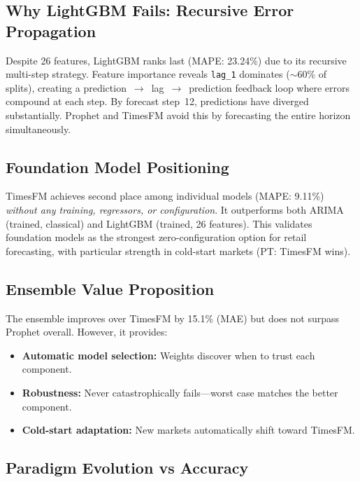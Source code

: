 \documentclass[10pt,twocolumn,a4paper]{article}
\begin{document}
\subsection{Why LightGBM Fails: Recursive Error Propagation}

Despite 26 features, LightGBM ranks last (MAPE: 23.24\%) due to its recursive multi-step strategy. Feature importance reveals \texttt{lag\_1} dominates ($\sim$60\% of splits), creating a prediction~$\rightarrow$~lag~$\rightarrow$~prediction feedback loop where errors compound at each step. By forecast step~12, predictions have diverged substantially. Prophet and TimesFM avoid this by forecasting the entire horizon simultaneously.

\subsection{Foundation Model Positioning}

TimesFM achieves second place among individual models (MAPE: 9.11\%) \textit{without any training, regressors, or configuration}. It outperforms both ARIMA (trained, classical) and LightGBM (trained, 26 features). This validates foundation models as the strongest zero-configuration option for retail forecasting, with particular strength in cold-start markets (PT: TimesFM wins).

\subsection{Ensemble Value Proposition}

The ensemble improves over TimesFM by 15.1\% (MAE) but does not surpass Prophet overall. However, it provides:
\begin{itemize}[leftmargin=*,noitemsep,topsep=2pt]
    \item \textbf{Automatic model selection:} Weights discover when to trust each component.
    \item \textbf{Robustness:} Never catastrophically fails---worst case matches the better component.
    \item \textbf{Cold-start adaptation:} New markets automatically shift toward TimesFM.
\end{itemize}

\subsection{Paradigm Evolution vs Accuracy}
\end{document}
